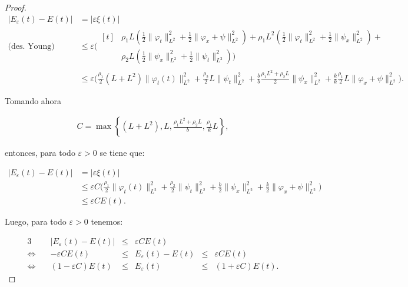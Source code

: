 \begin{proof}
    \begin{align*}
        \lvert E_\varepsilon(t) - E(t)\rvert &= \lvert \varepsilon \xi(t) \rvert\\
        \text{(des. Young)}&\leq \varepsilon\Bigg(
        \begin{aligned}[t]
            &\rho_1L\left(\frac{1}{2}\lVert \varphi_t\rVert^2_{L^2} + \frac{1}{2}\lVert\varphi_x + \psi\rVert^2_{L^2} \right) + \rho_1L^2\left(\frac{1}{2}\lVert \varphi_t\rVert^2_{L^2} + \frac{1}{2}\lVert\psi_x\rVert^2_{L^2}\right) + \\
            &\rho_2L\left(\frac{1}{2}\lVert\psi_x\rVert^2_{L^2} + \frac{1}{2}\lVert\psi_t\rVert^2_{L^2}\right)\Bigg)
        \end{aligned}\\
        &\leq \varepsilon\Bigg(\frac{\rho_1}{2}(L + L^2)\lVert \varphi_t(t)\rVert^2_{L^2} + \frac{\rho_2}{2}L\lVert\psi_t\rVert^2_{L^2} + \frac{b}{b}\frac{\rho_1L^2 + \rho_2L}{2}\lVert \psi_x\rVert^2_{L^2} + \frac{k}{k}\frac{\rho_1}{2}L\lVert \varphi_x + \psi \rVert^2_{L^2}\Bigg).
    \end{align*}

    Tomando ahora

    \begin{align}
        \label{defC}
        C = \max \left\{(L + L^2), L, \frac{\rho_1L^2 + \rho_2L}{b}, \frac{\rho_1}{k}L \right\},
    \end{align}

    entonces, para todo $\varepsilon > 0$ se tiene que:

    \begin{align*}
        \lvert E_\varepsilon(t) - E(t)\rvert &= \lvert \varepsilon \xi(t) \rvert\\
        &\leq \varepsilon C \Bigg(\frac{\rho_1}{2}\lVert \varphi_t(t)\rVert^2_{L^2} + \frac{\rho_2}{2}\lVert\psi_t\rVert^2_{L^2} + \frac{b}{2}\lVert \psi_x\rVert^2_{L^2} + \frac{k}{2}\lVert \varphi_x + \psi \rVert^2_{L^2}\Bigg)\\
        &\leq \varepsilon C E(t).
    \end{align*}

    Luego, para todo $\varepsilon > 0$ tenemos:

    \begin{alignat*}{3}
        &\lvert E_\varepsilon(t) - E(t)\rvert &{}\leq{}& \varepsilon C E(t)\\
        \iff\quad &-\varepsilon C E(t) &{}\leq{}& E_\varepsilon(t) - E(t) &{}\leq{}& \varepsilon C E(t)\\
        \iff\quad &(1-\varepsilon C)E(t) &{}\leq{}& E_\varepsilon(t) &{}\leq{}& (1+\varepsilon C)E(t).
    \end{alignat*}


\end{proof}
